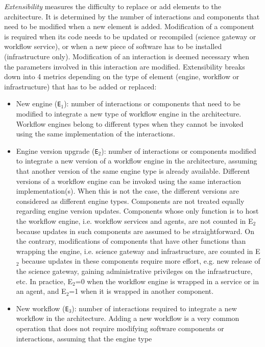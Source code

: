 \documentclass[preprint,3p,twocolumn]{elsarticle}
\begin{document}
\emph{Extensibility} measures the difficulty to replace or add
elements to the architecture. It is determined by the number of interactions and
components that need to be modified when a new element is
added. Modification of a component is required when its code needs to
be updated or recompiled (science gateway or workflow service), or
when a new piece of software has to be installed (infrastructure
only). Modification of an interaction is deemed necessary when the
parameters involved in this interaction are modified.  Extensibility
breaks down into 4 metrics depending on the type of element (engine, workflow or infrastructure) that has to
be added or replaced:
\begin{itemize}[leftmargin=0cm,itemindent=0.35cm,itemsep=0cm]
\item New engine (\texttt{E$_1$}): number of interactions or
  components that need to be modified to integrate a new type of
  workflow engine in the architecture. Workflow engines belong to
  different types when they cannot be invoked using the same
  implementation of the interactions.
 \item Engine version upgrade (\texttt{E$_2$}): number of interactions
  or components modified to integrate a new version of a workflow
  engine in the architecture, assuming that another version of the
  same engine type is already available. Different versions of a
  workflow engine can be invoked using the same interaction
  implementation(s). When this is not the case, the different versions
  are considered as different engine types. Components are not treated
  equally regarding engine version updates. Components whose only
  function is to host the workflow engine, i.e. workflow services and
  agents, are not counted in E$_2$ because updates in such components
  are assumed to be straightforward. On the contrary, modifications of
  components that have other functions than wrapping the engine,
  i.e. science gateway and infrastructure, are counted in E$_2$
  because updates in these components require more effort, e.g. new
  release of the science gateway, gaining administrative privileges on
  the infrastructure, etc. In practice, E$_2$=0 when the workflow
  engine is wrapped in a service or in an agent, and E$_2$=1 when it is
  wrapped in another component.  
\item New workflow (\texttt{E$_3$}): number of interactions required
  to integrate a new workflow in the architecture. Adding a new
  workflow is a very common operation that does not require modifying
  software components or interactions, assuming that the engine type

\end{itemize}
\end{document}
